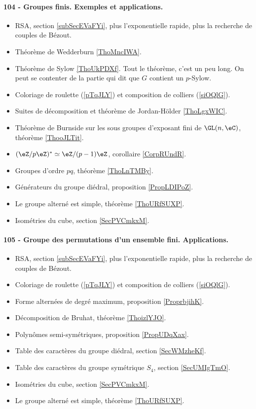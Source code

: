 \paragraph{104 - Groupes finis. Exemples et applications.}
\begin{itemize}
    \item RSA, section \ref{subSecEVaFYi}, plus l'exponentielle rapide, plus la recherche de couples de Bézout.
    \item Théorème de Wedderburn \ref{ThoMncIWA}.
    \item Théorème de Sylow \ref{ThoUkPDXf}. Tout le théorème, c'est un peu long. On peut se contenter de la partie qui dit que \( G\) contient un \( p\)-Sylow.
    \item Coloriage de roulette (\ref{pTqJLY}) et composition de colliers (\ref{siOQlG}).
    \item Suites de décomposition et théorème de Jordan-Hölder \ref{ThoLgxWIC}.
    \item Théorème de Burnside sur les sous groupes d'exposant fini de \( \GL(n,\eC)\), théorème \ref{ThooJLTit}.
    \item \( (\eZ/p\eZ)^*\simeq \eZ/(p-1)\eZ\), corollaire \ref{CorpRUndR}.
    \item Groupes d'ordre \( pq\), théorème \ref{ThoLnTMBy}.
    \item Générateurs du groupe diédral, proposition \ref{PropLDIPoZ}.
    \item Le groupe alterné est simple, théorème \ref{ThoURfSUXP}.
    \item Isométries du cube, section \ref{SecPVCmkxM}.
\end{itemize}
\paragraph{105 - Groupe des permutations d’un ensemble fini. Applications.}
\begin{itemize}
    \item RSA, section \ref{subSecEVaFYi}, plus l'exponentielle rapide, plus la recherche de couples de Bézout.
    \item Coloriage de roulette (\ref{pTqJLY}) et composition de colliers (\ref{siOQlG}).
    \item Forme alternées de degré maximum, proposition \ref{ProprbjihK}.
    \item Décomposition de Bruhat, théorème \ref{ThoizlYJO}.
    \item Polynômes semi-symétriques, proposition \ref{PropUDqXax}.
    \item Table des caractères du groupe diédral, section \ref{SecWMzheKf}.
    \item Table des caractères du groupe symétrique \( S_4\), section \ref{SecUMIgTmO}.
    \item Isométries du cube, section \ref{SecPVCmkxM}.
    \item Le groupe alterné est simple, théorème \ref{ThoURfSUXP}.
\end{itemize}

